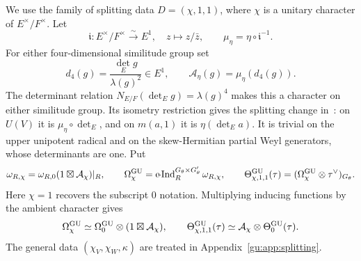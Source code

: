 We use the family of splitting data $D=(\chi,1,1)$, where $\chi$ is a
unitary character of $E^\times/F^\times$. Let
\[
 \mathfrak i:E^\times/F^\times\xrightarrow{\sim}E^1,
 \quad z\mapsto z/\bar z,\qquad \mu_\eta=\eta\circ\mathfrak i^{-1}.
\]
For either four-dimensional similitude group set
\begin{equation}\label{gu:eq:ambient-character}
 d_4(g)=\frac{\det_Eg}{\lambda(g)^2}\in E^1,\qquad
 \mathcal A_\eta(g)=\mu_\eta(d_4(g)).
\end{equation}
The determinant relation $N_{E/F}(\det_Eg)=\lambda(g)^4$ makes this a
character on either similitude group. Its isometry restriction gives the
splitting change in~\cite[equations~(3.1)--(3.3)]{ChenGan}: on $U(V)$ it is
$\mu_\eta\circ\det_E$, and on $m(a,1)$ it is $\eta(\det_Ea)$.
It is trivial on the upper unipotent radical and on the skew-Hermitian
partial Weyl generators, whose determinants are one. Put
\begin{equation}\label{gu:eq:chi-oscillator}
 \omega_{R,\chi}=\omega_{R,0}(1\boxtimes\mathcal A_\chi)|_R,
 \qquad \Omega_\chi^{\operatorname{GU}}=\operatorname{c\!-Ind}_R^{G_\theta\times G'_\theta}\omega_{R,\chi},
 \qquad \Theta_{\chi,1,1}^{\operatorname{GU}}(\tau)
       =(\Omega_\chi^{\operatorname{GU}}\otimes\tau^\vee)_{G_\theta}.
\end{equation}
Here $\chi=1$ recovers the subscript $0$ notation. Multiplying inducing
functions by the ambient character gives
\begin{equation}\label{gu:eq:chi-twist}
 \Omega_\chi^{\operatorname{GU}}\simeq
 \Omega_0^{\operatorname{GU}}\otimes(1\boxtimes\mathcal A_\chi),\qquad
 \Theta_{\chi,1,1}^{\operatorname{GU}}(\tau)
 \simeq\mathcal A_\chi\otimes\Theta_0^{\operatorname{GU}}(\tau).
\end{equation}
The general data $(\chi_V,\chi_W,\kappa)$ are treated in
Appendix~\ref{gu:app:splitting}.

